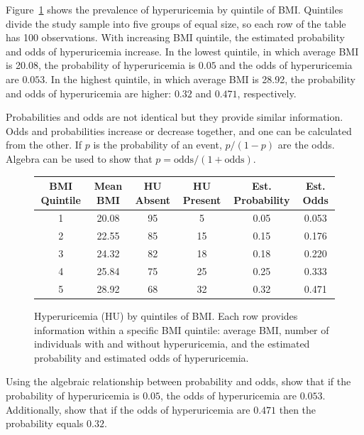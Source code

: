 Figure~\ref{figure:huBMIQuintiles} shows the prevalence of hyperuricemia by quintile of BMI.  Quintiles divide the study sample into five groups of equal size, so each row of the table has 100 observations. With increasing BMI quintile, the estimated probability and odds of hyperuricemia increase. In the lowest quintile, in which average BMI is 20.08, the probability of hyperuricemia is $0.05$ and the odds of hyperuricemia are $0.053$. In the highest quintile, in which average BMI is 28.92, the probability and odds of hyperuricemia are higher: $0.32$ and $0.471$, respectively.

Probabilities and odds are not identical but they provide similar information. Odds and probabilities increase or decrease together, and one can be calculated from the other.  If $p$ is the probability of an event, $p/(1 - p)$ are the odds.  Algebra can be used to show that $p = \textrm{odds} / (1 + \textrm{odds})$.

\begin{figure}[ht]
\centering
\begin{tabular}{cc|cc|cc}
  \hline
  \textbf{BMI Quintile} & \textbf{Mean BMI} & \textbf{HU Absent} & \textbf{HU Present} & \textbf{Est. Probability} & \textbf{Est. Odds} \\
  \hline
  1 & 20.08 & 95 & 5 & 0.05 & 0.053 \\
  2 & 22.55 & 85 & 15 & 0.15 & 0.176 \\
  3 & 24.32 & 82 & 18 & 0.18 & 0.220 \\
  4 & 25.84 & 75 & 25 & 0.25 & 0.333\\
  5 & 28.92 & 68 & 32 & 0.32 & 0.471\\
   \hline
\end{tabular}
\caption{Hyperuricemia (HU) by quintiles of BMI. Each row provides information within a specific BMI quintile: average BMI, number of individuals with and without hyperuricemia, and the estimated probability and estimated odds of hyperuricemia.}
\label{figure:huBMIQuintiles}
\end{figure}


\begin{exercisewrap}
\begin{nexercise}
  Using the algebraic relationship between probability and odds, show that if the probability of hyperuricemia is $0.05$, the odds of hyperuricemia are $0.053$. Additionally, show that if the odds of hyperuricemia are $0.471$ then the probability equals $0.32$.\footnotemark{}
\end{nexercise}
\end{exercisewrap}

